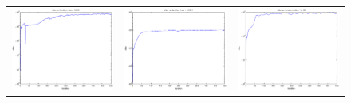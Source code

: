 \documentclass{article} %
\begin{document}
\begin{figure}
\begin{tabular}{ccc}
\includegraphics[scale=0.3]{figures/func1-svi-lrate1e-03-bound.eps} &
\includegraphics[scale=0.3]{figures/func1-svi-lrate1e-04-bound.eps} &
\includegraphics[scale=0.3]{figures/func1-svi-lrate1e-05-bound.eps} \\ 

\end{tabular}
\end{figure}
\end{document}

